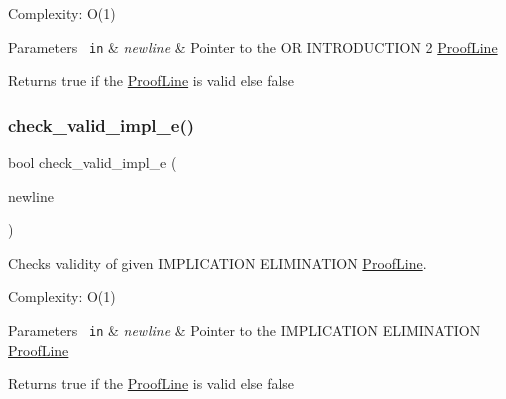 Complexity\+: O(1) 
\begin{DoxyParams}[1]{Parameters}
\mbox{\texttt{ in}}  & {\em newline} & Pointer to the OR I\+N\+T\+R\+O\+D\+U\+C\+T\+I\+ON 2 \mbox{\hyperlink{classProofLine}{Proof\+Line}} \\
\hline
\end{DoxyParams}
\begin{DoxyReturn}{Returns}
true if the \mbox{\hyperlink{classProofLine}{Proof\+Line}} is valid else false 
\end{DoxyReturn}
\mbox{\label{classProofLine_a0c6ca18751b18ba87a745683438fe31a}} 
\subsubsection{\texorpdfstring{check\+\_\+valid\+\_\+impl\+\_\+e()}{check\_valid\_impl\_e()}}
{\footnotesize\ttfamily bool check\+\_\+valid\+\_\+impl\+\_\+e (\begin{DoxyParamCaption}\item[{\mbox{\hyperlink{classProofLine}{Proof\+Line}} $\ast$}]{newline }\end{DoxyParamCaption})\hspace{0.3cm}{\ttfamily [related]}}



Checks validity of given I\+M\+P\+L\+I\+C\+A\+T\+I\+ON E\+L\+I\+M\+I\+N\+A\+T\+I\+ON \mbox{\hyperlink{classProofLine}{Proof\+Line}}. 

Complexity\+: O(1) 
\begin{DoxyParams}[1]{Parameters}
\mbox{\texttt{ in}}  & {\em newline} & Pointer to the I\+M\+P\+L\+I\+C\+A\+T\+I\+ON E\+L\+I\+M\+I\+N\+A\+T\+I\+ON \mbox{\hyperlink{classProofLine}{Proof\+Line}} \\
\hline
\end{DoxyParams}
\begin{DoxyReturn}{Returns}
true if the \mbox{\hyperlink{classProofLine}{Proof\+Line}} is valid else false 
\end{DoxyReturn}
\mbox{\label{classProofLine_a067d8de671da3f3ce43054723e31d232}} 
